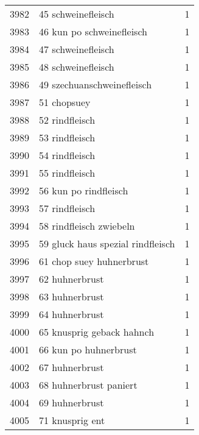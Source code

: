 \begin{tabular}{llr}
3982 &                                 45 schweinefleisch &      1 \\
3983 &                          46 kun po schweinefleisch &      1 \\
3984 &                                 47 schweinefleisch &      1 \\
3985 &                                 48 schweinefleisch &      1 \\
3986 &                         49 szechuanschweinefleisch &      1 \\
3987 &                                        51 chopsuey &      1 \\
3988 &                                     52 rindfleisch &      1 \\
3989 &                                     53 rindfleisch &      1 \\
3990 &                                     54 rindfleisch &      1 \\
3991 &                                     55 rindfleisch &      1 \\
3992 &                              56 kun po rindfleisch &      1 \\
3993 &                                     57 rindfleisch &      1 \\
3994 &                            58 rindfleisch zwiebeln &      1 \\
3995 &                  59 gluck haus spezial rindfleisch &      1 \\
3996 &                           61 chop suey huhnerbrust &      1 \\
3997 &                                     62 huhnerbrust &      1 \\
3998 &                                     63 huhnerbrust &      1 \\
3999 &                                     64 huhnerbrust &      1 \\
4000 &                          65 knusprig geback hahnch &      1 \\
4001 &                              66 kun po huhnerbrust &      1 \\
4002 &                                     67 huhnerbrust &      1 \\
4003 &                             68 huhnerbrust paniert &      1 \\
4004 &                                     69 huhnerbrust &      1 \\
4005 &                                    71 knusprig ent &      1 \\

\end{tabular}
